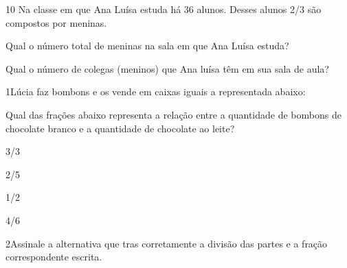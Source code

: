 
\num{10} Na classe em que Ana Luísa estuda há 36 alunos. Desses alunos 2/3
são compostos por meninas.

\begin{escolha}
\item
  Qual o número total de meninas na sala em que Ana Luísa estuda?


\item
  Qual o número de colegas (meninos) que Ana luísa têm em sua sala de
  aula?

\end{escolha}



\num{1}Lúcia faz bombons e os vende em caixas iguais a representada abaixo:


Qual das frações abaixo representa a relação entre a quantidade de
bombons de chocolate branco e a quantidade de chocolate ao leite?

\begin{escolha}
\item
  3/3
\item
  2/5
\item
  1/2
\item
  4/6
\end{escolha}


\num{2}Assinale a alternativa que tras corretamente a divisão das partes e
a fração correspondente escrita.

